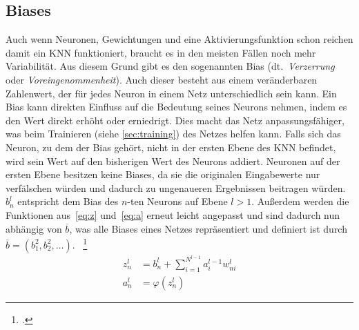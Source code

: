 \subsection{Biases}\label{subsec:biases}
Auch wenn Neuronen, Gewichtungen und eine Aktivierungsfunktion schon reichen damit ein KNN funktioniert, braucht es in den meisten Fällen noch mehr Variabilität.
Aus diesem Grund gibt es den sogenannten Bias (dt.~\textit{Verzerrung} oder \textit{Voreingenommenheit}).
Auch dieser besteht aus einem veränderbaren Zahlenwert, der für jedes Neuron in einem Netz unterschiedlich sein kann.
Ein Bias kann direkten Einfluss auf die Bedeutung seines Neurons nehmen, indem es den Wert direkt erhöht oder erniedrigt.
Dies macht das Netz anpassungsfähiger, was beim Trainieren (siehe \autoref{sec:training}) des Netzes helfen kann.
Falls sich das Neuron, zu dem der Bias gehört, nicht in der ersten Ebene des KNN befindet, wird sein Wert auf den bisherigen Wert des Neurons addiert.
Neuronen auf der ersten Ebene besitzen keine Biases, da sie die originalen Eingabewerte nur verfälschen würden und dadurch zu ungenaueren Ergebnissen beitragen würden.\\
$b^l_n$ entspricht dem Bias des $n$-ten Neurons auf Ebene $l > 1$.
Außerdem werden die Funktionen aus~\eqref{eq:z} und~\eqref{eq:a} erneut leicht angepasst und sind dadurch nun abhängig von $\overline{b}$, was alle Biases eines Netzes repräsentiert und definiert ist durch $\overline{b} = (b^2_1, b^2_2, \dots)$.
~\footcite{3b1b-1}
\begin{align}
    z^l_n &= b^l_n + \sum\limits^{N^{l-1}}_{i=1}a^{l-1}_i w^l_{n i}
    \label{eq:z-neu}\\
    a^l_n &= \varphi(z^l_n)
    \label{eq:a-neu}
\end{align}

